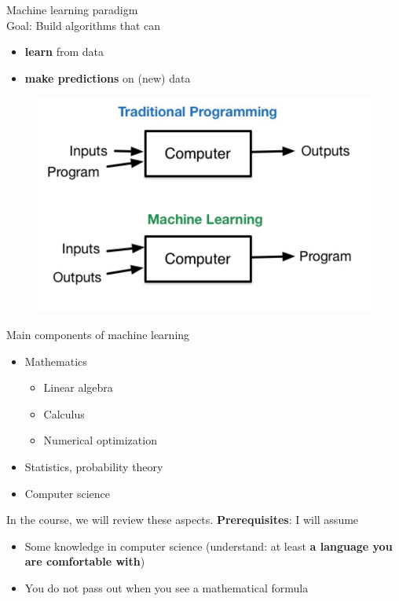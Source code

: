 \documentclass{beamer}
\begin{document}
\begin{frame}{Machine learning paradigm}
~\\
\vfill
Goal: Build algorithms that can 
\begin{itemize}
	\item \textbf{learn} from data
	\item \textbf{make predictions} on (new) data
\end{itemize}
\vfill
\pause
\begin{figure}
\centering
\includegraphics[width=\textwidth]{images/ml_vs_traditional.jpg}
\end{figure}
\vfill
\end{frame}

\begin{frame}{Main components of machine learning}
\vfill
\begin{itemize}
\item Mathematics
	\begin{itemize}
		\item Linear algebra
		\item Calculus
		\item Numerical optimization
	\end{itemize}
\vfill
\item Statistics, probability theory
\vfill
\item Computer science
\end{itemize}
\vfill
\pause
In the course, we will review these aspects.
\vfill
\textbf{Prerequisites}: I will assume
\begin{itemize}
	\item Some knowledge in computer science (understand: at least \textbf{a language you are comfortable with})
	\item You do not pass out when you see a mathematical formula
\end{itemize}
\vfill
\end{frame}
\end{document}
